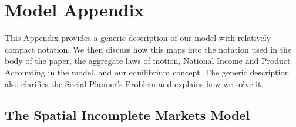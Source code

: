 \documentclass[12pt,pdftex]{article}
\def\thesection{\arabic{section}}
\def\thesubsection{\arabic{section}.\arabic{subsection}}
\begin{document}
\newpage
\clearpage




\section{Model Appendix} \label{app:social_planner}

This Appendix provides a generic description of our model with relatively compact notation. We then discuss how this maps into the notation used in the body of the paper, the aggregate laws of motion, National Income and Product Accounting in the model, and our equilibrium concept. The generic description also clarifies the Social Planner's Problem and explains how we solve it.

\subsection{The Spatial Incomplete Markets Model}
\end{document}
